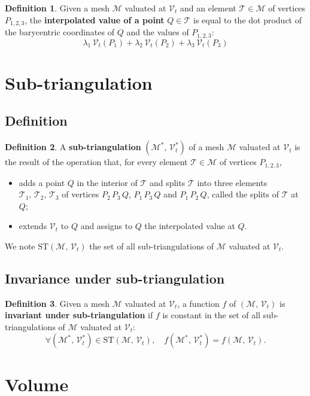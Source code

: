 \documentclass{article}
\theoremstyle{definition}
\newtheorem{defn}{Definition}
\newcommand{\MM}{\mathcal{M}}
\newcommand{\VV}{\mathcal{V}}
\newcommand{\TT}{\mathcal{T}}
\newcommand{\ST}{\mathrm{ST}}
\begin{document}
\begin{defn}
Given a mesh $\MM$ valuated at $\VV_t$ and an element $\TT\in\MM$ of vertices $P_{1,2,3}$, the \textbf{interpolated value of a point} $Q\in\TT$ is equal to the dot product of the barycentric coordinates of $Q$ and the values of $P_{1,2,3}$:
\[\lambda_1\,\VV_t(P_1) + \lambda_2\,\VV_t(P_2) + \lambda_3\,\VV_t(P_3)\]
\end{defn}


\section{Sub-triangulation}
\subsection{Definition}
\begin{defn}
A \textbf{sub-triangulation} $(\MM^*,\,\VV_t^*)$ of a mesh $\MM$ valuated at $\VV_t$ is the result of the operation that, for every element $\TT\in\MM$ of vertices $P_{1,2,3}$,
\begin{itemize}
\item adds a point $Q$ in the interior of $\TT$ and splits $\TT$ into three elements $\TT_1,\,\TT_2,\,\TT_3$ of vertices $P_2\,P_3\,Q$, $P_1\,P_3\,Q$ and $P_1\,P_2\,Q$, called the splits of $\TT$ at $Q$;
\item extends $\VV_t$ to $Q$ and assigns to $Q$ the interpolated value at $Q$.
\end{itemize}
We note $\ST(\MM,\,\VV_t)$ the set of all sub-triangulations of $\MM$ valuated at $\VV_t$.
\end{defn}

\subsection{Invariance under sub-triangulation}
\begin{defn}
Given a mesh $\MM$ valuated at $\VV_t$, a function $f$ of $(\MM,\,\VV_t)$ is \textbf{invariant under sub-triangulation} if $f$ is constant in the set of all sub-triangulations of $\MM$ valuated at $\VV_t$:
\[\forall (\MM^*,\,\VV_t^*)\in\ST(\MM,\,\VV_t),\quad f(\MM^*,\,\VV_t^*) = f(\MM,\,\VV_t).\]
\end{defn}




\section{Volume}
\end{document}
